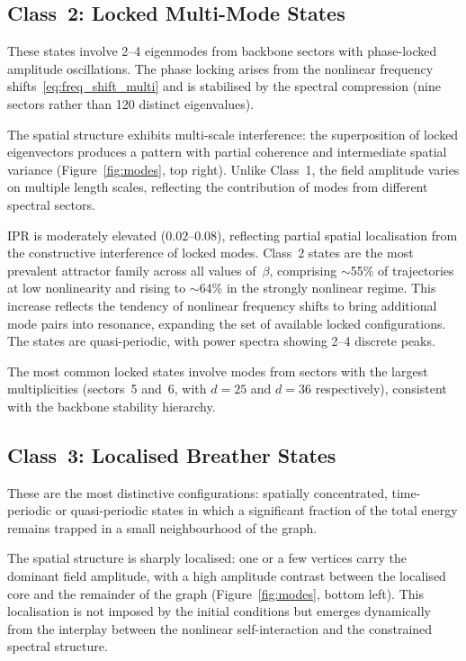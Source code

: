 \documentclass[12pt,a4paper]{article}
\begin{document}
\subsection{Class~2: Locked Multi-Mode States}

These states involve 2--4 eigenmodes from backbone sectors with
phase-locked amplitude oscillations.  The phase locking arises from
the nonlinear frequency shifts~\eqref{eq:freq_shift_multi} and is
stabilised by the spectral compression (nine sectors rather than 120
distinct eigenvalues).

The spatial structure exhibits multi-scale interference: the
superposition of locked eigenvectors produces a pattern with partial
coherence and intermediate spatial variance
(Figure~\ref{fig:modes}, top right).  Unlike Class~1, the field
amplitude varies on multiple length scales, reflecting the
contribution of modes from different spectral sectors.

IPR is moderately elevated ($0.02$--$0.08$), reflecting partial
spatial localisation from the constructive interference of locked
modes.  Class~2 states are the most prevalent attractor family across
all values of~$\beta$, comprising $\sim$55\% of trajectories at low
nonlinearity and rising to $\sim$64\% in the strongly nonlinear regime.
This increase reflects the tendency of nonlinear frequency shifts to
bring additional mode pairs into resonance, expanding the set of
available locked configurations.  The states are quasi-periodic, with
power spectra showing 2--4 discrete peaks.

The most common locked states involve modes from sectors with the
largest multiplicities (sectors~5 and~6, with $d = 25$ and $d = 36$
respectively), consistent with the backbone stability hierarchy.

\subsection{Class~3: Localised Breather States}

These are the most distinctive configurations: spatially concentrated,
time-periodic or quasi-periodic states in which a significant fraction
of the total energy remains trapped in a small neighbourhood of the
graph.

The spatial structure is sharply localised: one or a few vertices
carry the dominant field amplitude, with a high amplitude contrast
between the localised core and the remainder of the graph
(Figure~\ref{fig:modes}, bottom left).  This localisation is not
imposed by the initial conditions but emerges dynamically from the
interplay between the nonlinear self-interaction and the constrained
spectral structure.
\end{document}

